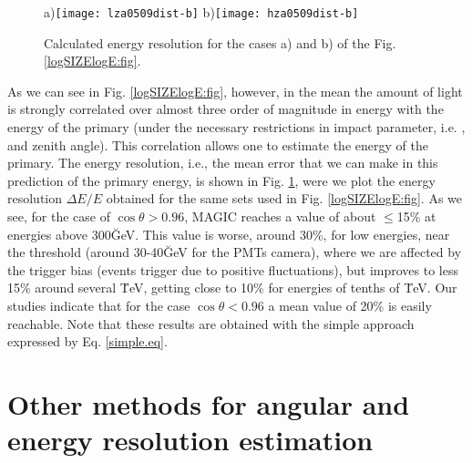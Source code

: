 \begin{figure}[t]
\centering
a)\texttt{[image: lza0509dist-b]}
\hfil
b)\texttt{[image: hza0509dist-b]}
\caption{\label{resolutions:fig}
  Calculated energy resolution for the cases a) and b) of the Fig.
  \protect\ref{logSIZElogE:fig}.}
\vskip -15pt
\end{figure}

As we can see in Fig.  \ref{logSIZElogE:fig}, however, in the mean the
amount of light is strongly correlated over almost three order of
magnitude in energy with the energy of the primary (under the
necessary restrictions in impact parameter, i.e. \DISTANCE, and zenith
angle).  This correlation allows one to estimate the energy of the
primary.  The energy resolution, i.e., the mean error that we can make
in this prediction of the primary energy, is shown in Fig.
\ref{resolutions:fig}, were we plot the energy resolution $\Delta E/E$
obtained for the same sets used in Fig.  \ref{logSIZElogE:fig}. As we
see, for the case of $\cos\theta>0.96$, MAGIC reaches a value of about
$\leq$15\% at energies above 300\u{GeV}. This value is worse, around
30\%, for low energies, near the threshold (around 30-40\u{GeV} for
the PMTs camera), where we are affected by the trigger bias (events
trigger due to positive fluctuations), but improves to less 15\%
around several \u{TeV}, getting close to 10\% for energies of tenths
of \u{TeV}.  Our studies indicate that for the case $\cos\theta<0.96$
a mean value of 20\% is easily reachable.  Note that these results are
obtained with the simple approach expressed by Eq.  \ref{simple.eq}.

\section{Other methods for angular and energy resolution estimation}

\endinput
%

